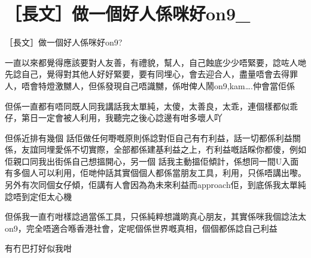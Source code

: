 \chapter{［長文］做一個好人係咪好on9\_}

［長文］做一個好人係咪好on9?

一直以來都覺得應該要對人友善，有禮貌，幫人，自己蝕底少少唔緊要，諗咗人哋先諗自己，覺得對其他人好好緊要，要有同埋心，會去迎合人，盡量唔會去得罪人，唔會特燈激嬲人，但係發現自己唔識嬲，係咁俾人鬧on9,kam….仲會當佢係

但係一直都有唔同既人同我講話我太單純，太傻，太善良，太乖，連個樣都似乖仔，第日一定會被人利用，我聽完之後心諗邊有咁多壞人吖

但係近排有幾個 話佢做任何嘢嘅原則係諗對佢自己有冇利益，話一切都係利益關係，友誼同埋愛係不切實際，全部都係建基利益之上，冇利益嘅話睬你都傻，例如佢親口同我出街係自己想搵開心，另一個 話我主動搵佢傾計，係想同一間U入面有多個人可以利用，佢哋仲話其實個個人都係當朋友工具，利用，只係唔講出嚟。另外有次同個女仔傾，佢講有人會因為為未來利益而approach佢，到底係我太單純諗唔到定佢太心機

但係我一直冇咁樣諗過當係工具，只係純粹想識啲真心朋友，其實係咪我個諗法太on9，完全唔適合喺香港社會，定呢個係世界嘅真相，個個都係諗自己利益

有冇巴打好似我咁

